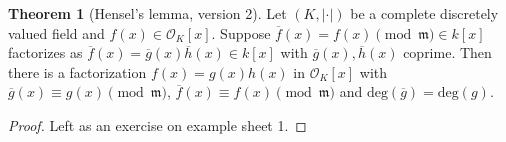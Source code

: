 \documentclass{article}
\theoremstyle{definition}
\newtheorem{theorem}{Theorem}[section]
\begin{document}
\begin{theorem}[Hensel's lemma, version 2]
    Let $(K, |\cdot|)$ be a complete discretely valued field and $f(x) \in \mathcal{O}_K[x]$. Suppose $\overline{f}(x) = f(x) \pmod{\mathfrak{m}} \in k[x]$ factorizes as $\overline{f}(x) = \overline{g}(x)\overline{h}(x) \in k[x]$ with $\overline{g}(x), \overline{h}(x)$ coprime. Then there is a factorization $f(x) = g(x)h(x)$ in $\mathcal{O}_K[x]$ with $\overline{g}(x) \equiv g(x) \pmod{\mathfrak{m}}$, $\overline{f}(x) \equiv f(x) \pmod{\mathfrak{m}}$ and $\text{deg}(\overline{g}) = \text{deg}(g)$.
\end{theorem}
\begin{proof}
    Left as an exercise on example sheet 1.
\end{proof}
\end{document}
